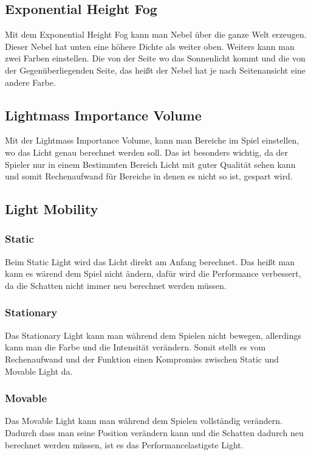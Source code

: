 \subsection{Exponential Height Fog}
Mit dem Exponential Height Fog kann man Nebel über die ganze Welt erzeugen. Dieser Nebel hat unten eine höhere Dichte als weiter oben. Weiters kann man zwei Farben einstellen.
Die von der Seite wo das Sonnenlicht kommt und die von der Gegenüberliegenden Seite, das heißt der Nebel hat je nach Seitenansicht eine andere Farbe. \citep{unreal:exponentialHeightFog}

\subsection{Lightmass Importance Volume}
Mit der Lightmass Importance Volume, kann man Bereiche im Spiel einstellen, wo das Licht genau berechnet werden soll. Das ist besonders wichtig, da der Spieler nur in einem
Bestimmten Bereich Licht mit guter Qualität sehen kann und somit Rechenaufwand für Bereiche in denen es nicht so ist, gespart wird. \citep{unreal:lightmassImportanceVolume}

\subsection{Light Mobility}
\subsubsection{Static}
Beim Static Light wird das Licht direkt am Anfang berechnet. Das heißt man kann es wärend dem Spiel nicht ändern, dafür wird die Performance verbessert, da
die Schatten nicht immer neu berechnet werden müssen. \citep{unreal:types_of_light}

\subsubsection{Stationary}
Das Stationary Light kann man während dem Spielen nicht bewegen, allerdings kann man die Farbe und die Intensität verändern. Somit stellt es vom Rechenaufwand und
der Funktion einen Kompromiss zwischen Static und Movable Light da. \citep{unreal:types_of_light}

\subsubsection{Movable}
Das Movable Light kann man während dem Spielen vollständig verändern. Dadurch dass man seine Position verändern kann und die Schatten dadurch neu berechnet werden müssen,
ist es das Performancelastigste Light.

